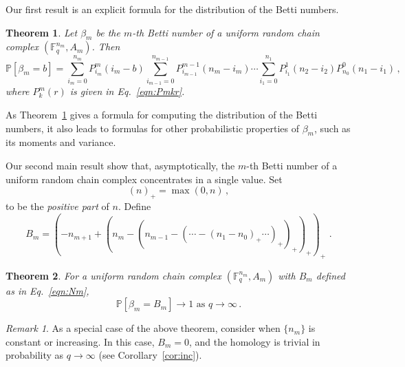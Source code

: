 \documentclass[3p,times]{elsarticle}
\newtheorem{bigthm}{Theorem}
\theoremstyle{remark}
\newtheorem{remark}[theorem]{Remark}
\newcommand{\Fq}{\mathbb{F}_q}
\newcommand\Fqn[1]{\mathbb{F}_q^{#1}}
\newcommand{\bP}{\mathbb{P}}
\newcommand{\ra}{\rightarrow}
\begin{document}
Our first result is an explicit formula for the distribution
of the Betti numbers.
\begin{bigthm} 
  \label{thm:bettinum}
  Let $\beta_m$ be the $m$-th Betti number of a uniform random chain complex
  $(\Fq^{n_m} , A_m)$. Then
  \[    
    \bP[\beta_m = b] = \sum_{i_m=0}^{n_{m}} P_{i_m}^{m}(i_m-b)
    \sum_{i_{m-1}=0}^{n_{m-1}} P_{i_{m-1}}^{m-1}\left(n_{m} -i_m\right) \cdots
    \sum_{i_1 = 0}^{n_1} P_{i_1}^1\left(n_2 - i_2\right) P_{n_0}^0 \left(n_1 - i_1\right) \, ,
  \]
  where $P^m_k(r)$ is given in Eq.~\eqref{eqn:Pmkr}.
\end{bigthm}

As Theorem~\ref{thm:bettinum} gives a formula for
computing the distribution of the Betti numbers, it also leads to formulas for
other probabilistic properties of $\beta_m$, such as its moments and variance.

Our second main result show that, asymptotically, the $m$-th Betti number of a uniform random chain complex concentrates in a single value. Set
\begin{equation*}
  (n)_+ = \max(0,n) \, , %
\end{equation*}
to be the {\em positive part} of $n$.
Define
\begin{equation}
  B_m = (-n_{m+1} + (n_m - (n_{m-1} - (\cdots - (n_1 - n_0)_+ \cdots)_+ )_+
  )_+)_+ \, \, .
  \label{eqn:Nm}
\end{equation}

\begin{bigthm}
  \label{thm:qtoinfty}
  For a uniform random chain complex $(\Fqn{n_m},A_m)$ with $B_m$ defined as in Eq.~\eqref{eqn:Nm},
  \[
    \bP[\beta_m = B_m] \ra 1 
    \mbox{ as } q \ra \infty  \, .
  \]
\end{bigthm}

\begin{remark}
  \label{rem:monotone}
  As a special case of the above theorem, consider when $\{n_m\}$
  is constant or increasing. In this case, 
  $B_m = 0$, and the homology is trivial in probability as $q \ra \infty$ 
  (see Corollary~\ref{cor:inc}). 
\end{remark}
\end{document}
